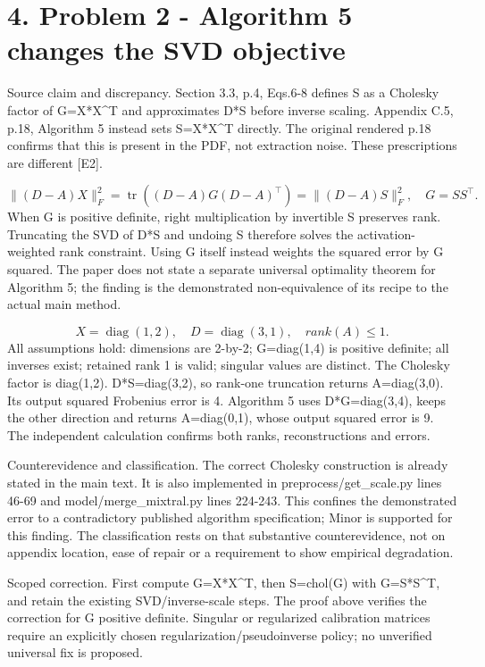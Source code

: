\documentclass[10pt]{article}
\begin{document}
\section*{4. Problem 2 - Algorithm 5 changes the SVD objective}
Source claim and discrepancy. Section 3.3, p.4, Eqs.6-8 defines S as a Cholesky factor of G=X*X\textasciicircum{}T and approximates D*S before inverse scaling. Appendix C.5, p.18, Algorithm 5 instead sets S=X*X\textasciicircum{}T directly. The original rendered p.18 confirms that this is present in the PDF, not extraction noise. These prescriptions are different [E2].\par
\[\|(D-A)X\|_F^2=\operatorname{tr}((D-A)G(D-A)^\top)=\|(D-A)S\|_F^2,\quad G=SS^\top.\] When G is positive definite, right multiplication by invertible S preserves rank. Truncating the SVD of D*S and undoing S therefore solves the activation-weighted rank constraint. Using G itself instead weights the squared error by G squared. The paper does not state a separate universal optimality theorem for Algorithm 5; the finding is the demonstrated non-equivalence of its recipe to the actual main method.\par
\[X=\operatorname{diag}(1,2),\quad D=\operatorname{diag}(3,1),\quad rank(A)\le1.\] All assumptions hold: dimensions are 2-by-2; G=diag(1,4) is positive definite; all inverses exist; retained rank 1 is valid; singular values are distinct. The Cholesky factor is diag(1,2). D*S=diag(3,2), so rank-one truncation returns A=diag(3,0). Its output squared Frobenius error is 4. Algorithm 5 uses D*G=diag(3,4), keeps the other direction and returns A=diag(0,1), whose output squared error is 9. The independent calculation confirms both ranks, reconstructions and errors.\par
Counterevidence and classification. The correct Cholesky construction is already stated in the main text. It is also implemented in preprocess/get\_scale.py lines 46-69 and model/merge\_mixtral.py lines 224-243. This confines the demonstrated error to a contradictory published algorithm specification; Minor is supported for this finding. The classification rests on that substantive counterevidence, not on appendix location, ease of repair or a requirement to show empirical degradation.\par
Scoped correction. First compute G=X*X\textasciicircum{}T, then S=chol(G) with G=S*S\textasciicircum{}T, and retain the existing SVD/inverse-scale steps. The proof above verifies the correction for G positive definite. Singular or regularized calibration matrices require an explicitly chosen regularization/pseudoinverse policy; no unverified universal fix is proposed.\par
\end{document}
